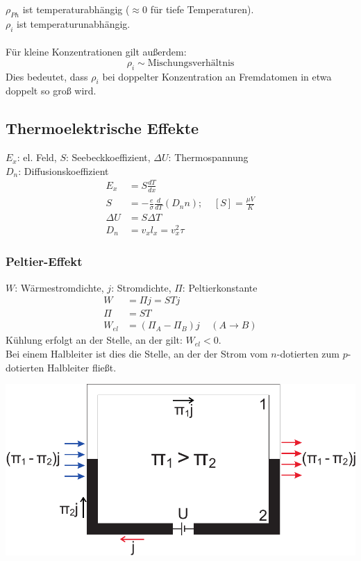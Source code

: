 \documentclass[a4paper,twocolumn,10pt]{article}
\begin{document}
$\rho_{Ph}$ ist temperaturabhängig ($\approx 0$ für tiefe Temperaturen).\\
$\rho_i$ ist temperaturunabhängig.\\\\
Für kleine Konzentrationen gilt außerdem:
\begin{equation*}
\rho_i\sim \text{Mischungsverhältnis}
\end{equation*}
Dies bedeutet, dass $\rho_i$ bei doppelter Konzentration an Fremdatomen in etwa doppelt so groß wird.
\subsection{Thermoelektrische Effekte}
$E_x$: el. Feld, $S$: Seebeckkoeffizient, $\Delta U$: Thermospannung\\
$D_n$: Diffusionskoeffizient
\begin{equation*}
\begin{split}
E_x&=S\frac{dT}{dx}\\
S&=-\frac{e}{\sigma}\frac{d}{dT}(D_nn);\;\;\;\;[S]=\frac{\mu V}{K}\\
\Delta U&=S\Delta T\\
D_n&=v_xl_x=v_x^2\tau
\end{split}
\end{equation*}

\subsubsection{Peltier-Effekt}
$W$: Wärmestromdichte, $j$: Stromdichte, $\Pi$: Peltierkonstante
\begin{equation*}
\begin{split}
W&=\Pi j=STj\\
\Pi &=ST\\
W_{el}&=(\Pi_A-\Pi_B)j\;\;\;\;(A\rightarrow B)
\end{split}
\end{equation*}
Kühlung erfolgt an der Stelle, an der gilt: $W_{el}<0$.\\
Bei einem Halbleiter ist dies die Stelle, an der der Strom vom $n$-dotierten zum $p$-dotierten Halbleiter fließt.\\
\begin{center}
\includegraphics[width=0.8\columnwidth]{Grafiken/Peltiereffekt}
\end{center}
\end{document}
